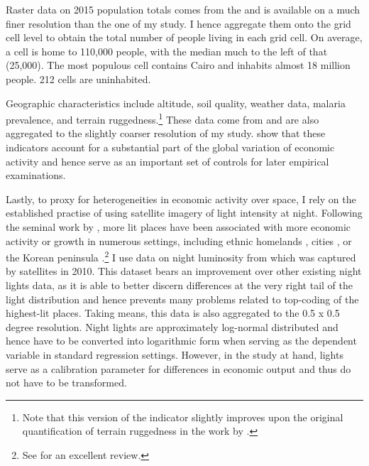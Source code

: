 \documentclass[11pt, oneside]{article}   	%
\begin{document}
Raster data on 2015 population totals comes from the \cite{socioeconomic_data_and_applications_center_gridded_2016} and is available on a much finer resolution than the one of my study. I hence aggregate them onto the grid cell level to obtain the total number of people living in each grid cell. On average, a cell is home to 110,000 people, with the median much to the left of that (25,000). The most populous cell contains Cairo and inhabits almost 18 million people. 212 cells are uninhabited.

Geographic characteristics include altitude, soil quality, weather data, malaria prevalence, and terrain ruggedness.\footnote{Note that this version of the indicator slightly improves upon the original quantification of terrain ruggedness in the work by \cite{nunn_ruggedness:_2012}. } These data come from \cite{henderson_global_2018} and are also aggregated to the slightly coarser resolution of my study. \citeauthor{henderson_global_2018} show that these indicators account for a substantial part of the global variation of economic activity and hence serve as an important set of controls for later empirical examinations.

Lastly, to proxy for heterogeneities in economic activity over space, I rely on the established practise of using satellite imagery of light intensity at night. Following the seminal work by \cite{henderson_measuring_2012}, more lit places have been associated with more economic activity or growth in numerous settings, including ethnic homelands \citep{MichalopoulosNationalInstitutionsSubnational2014}, cities \citep{storeygard_farther_2016}, or the Korean peninsula \citep{Lee_InternationalIsolationRegional_2016}.\footnote{See \cite{donaldson_view_2016} for an excellent review.} I use data on night luminosity from \cite{henderson_global_2018} which was captured by satellites in 2010. This dataset bears an improvement over other existing night lights data, as it is able to better discern differences at the very right tail of the light distribution and hence prevents many problems related to top-coding of the highest-lit places. Taking means, this data is also aggregated to the 0.5 x 0.5 degree resolution. Night lights are approximately log-normal distributed and hence have to be converted into logarithmic form when serving as the dependent variable in standard regression settings. However, in the study at hand, lights serve as a calibration parameter for differences in economic output and thus do not have to be transformed.
\end{document}
